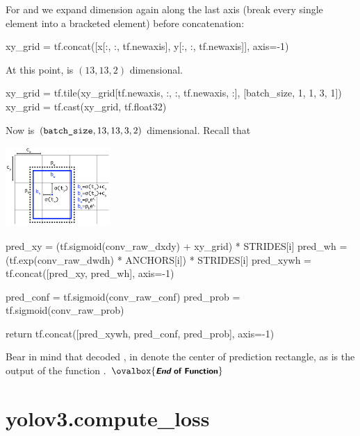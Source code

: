\documentclass[10pt,a4paper]{article}
\newcommand{\END}{\text{}\hfill$\ovalbox{\small\text{\bfseries\sffamily {\itshape End} of Function}}$\bigskip}
\begin{document}
For  and  we expand dimension again along the last axis (break every single element into a bracketed element) before concatenation:
\begin{py}
    xy_grid = tf.concat([x[:, :, tf.newaxis], y[:, :, tf.newaxis]], axis=-1)
\end{py}
At this point,  is $(13,13,2)$ dimensional.
\begin{py}
    xy_grid = tf.tile(xy_grid[tf.newaxis, :, :, tf.newaxis, :], [batch_size, 1, 1, 3, 1])
    xy_grid = tf.cast(xy_grid, tf.float32)
\end{py}
Now  is $(\code{batch_size}, 13, 13, 3, 2)$ dimensional. Recall that 
\begin{center}
\includegraphics[width=0.3\textwidth]{./decode_anchor.png}
\end{center}
\begin{py}
    pred_xy = (tf.sigmoid(conv_raw_dxdy) + xy_grid) * STRIDES[i]
    pred_wh = (tf.exp(conv_raw_dwdh) * ANCHORS[i]) * STRIDES[i]
    pred_xywh = tf.concat([pred_xy, pred_wh], axis=-1)

    pred_conf = tf.sigmoid(conv_raw_conf)
    pred_prob = tf.sigmoid(conv_raw_prob)

    return tf.concat([pred_xywh, pred_conf, pred_prob], axis=-1)
\end{py}
Bear in mind that decoded ,  in  denote the center of prediction rectangle, as is the output of the function . \END



\section{yolov3.compute\_loss}
\end{document}
